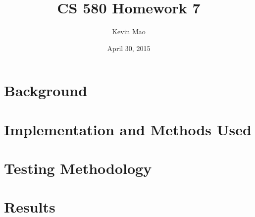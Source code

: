 \documentclass[11pt]{article}
\begin{document}
\title{CS 580 Homework 7}
\author{Kevin Mao}
\date{April 30, 2015}
\maketitle

\section*{Background}

\section*{Implementation and Methods Used}
\begin{comment}
Platform, methods, and important aspects of it.
\end{comment}

\section*{Testing Methodology}
\begin{comment}
Testing for both verification and identification
\end{comment}

\section*{Results}
\begin{comment}
Overall error for each phase and how this changes with changing certain parameters of the algorithm
\end{comment}
\end{document}
